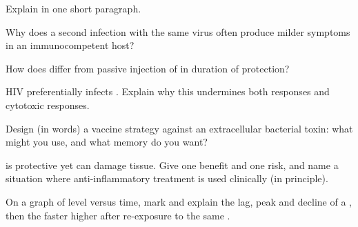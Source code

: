 \begin{exercise}[$\star\star$]\label{exo:g12:immunity:7}
Explain  in one short paragraph.
\end{exercise}

\begin{exercise}[$\star\star$]\label{exo:g12:immunity:8}
Why does a second infection with the same virus often produce milder
symptoms in an immunocompetent host?
\end{exercise}

\begin{exercise}[$\star\star$]\label{exo:g12:immunity:9}
How does  differ from passive injection of  in
duration of protection?
\end{exercise}

\begin{exercise}[$\star\star\star$]\label{exo:g12:immunity:10}
HIV preferentially infects . Explain why this undermines
both  responses and cytotoxic  responses.
\end{exercise}

\begin{exercise}[$\star\star\star$]\label{exo:g12:immunity:11}
Design (in words) a vaccine strategy against an extracellular bacterial
toxin: what  might you use, and what memory do you want?
\end{exercise}

\begin{exercise}[$\star\star\star$]\label{exo:g12:immunity:12}
 is protective yet can damage tissue. Give one benefit and
one risk, and name a situation where anti-inflammatory treatment is
used clinically (in principle).
\end{exercise}

\begin{exercise}[$\star\star$]\label{exo:g12:immunity:13}
On a graph of  level versus time, mark and explain the lag,
peak and decline of a , then the faster higher  after re-exposure to the same .
\end{exercise}

